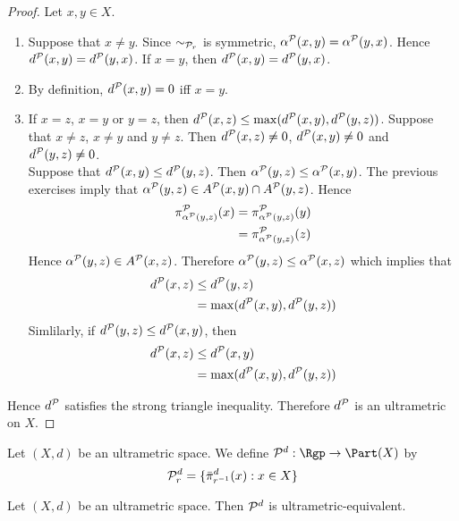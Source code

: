 \documentclass{book}
\begin{document}
\begin{proof}
	Let $x, y \in X$. 
	\begin{enumerate}
		\item Suppose that $x \neq y$. Since ${\sim_{\mathcal{P}_r}}$ is symmetric, $\alpha^{\mathcal{P}}(x,y) = \alpha^{\mathcal{P}}(y,x)$. Hence $d^{\mathcal{P}}(x,y) = d^{\mathcal{P}}(y,x)$. If $x = y$, then $d^{\mathcal{P}}(x,y) = d^{\mathcal{P}}(y,x)$. 
		\item By definition, $d^{\mathcal{P}}(x,y) = 0$ iff $x = y$.  
		\item If $x = z$, $x = y$ or $y=z$, then $d^{\mathcal{P}}(x,z) \leq \max(d^{\mathcal{P}}(x,y), d^{\mathcal{P}}(y,z))$. Suppose that $x \neq z$, $x \neq y$ and $y \neq z$. Then $d^{\mathcal{P}}(x,z) \neq 0$, $d^{\mathcal{P}}(x,y) \neq 0$ and $d^{\mathcal{P}}(y,z) \neq 0$. \\
		Suppose that $d^{\mathcal{P}}(x,y) \leq d^{\mathcal{P}}(y,z)$. Then $\alpha^{\mathcal{P}}(y,z) \leq \alpha^{\mathcal{P}}(x,y)$. The previous exercises imply that $\alpha^{\mathcal{P}}(y,z) \in A^{\mathcal{P}}(x,y) \cap A^{\mathcal{P}}(y,z)$. Hence
		\begin{align*}
			\pi^{\mathcal{P}}_{\alpha^{\mathcal{P}}(y,z)}(x) 
			& = \pi^{\mathcal{P}}_{\alpha^{\mathcal{P}}(y,z)}(y) \\
			& = \pi^{\mathcal{P}}_{\alpha^{\mathcal{P}}(y,z)}(z)
		\end{align*}
		Hence $\alpha^{\mathcal{P}}(y,z) \in A^{\mathcal{P}}(x, z)$. Therefore $\alpha^{\mathcal{P}}(y,z) \leq \alpha^{\mathcal{P}}(x,z)$ which implies that 
		\begin{align*}
			d^{\mathcal{P}}(x,z) 
			& \leq d^{\mathcal{P}}(y,z) \\
			& = \max(d^{\mathcal{P}}(x,y), d^{\mathcal{P}}(y,z))
		\end{align*}
		Simlilarly, if $d^{\mathcal{P}}(y,z) \leq d^{\mathcal{P}}(x,y)$, then 
		\begin{align*}
			d^{\mathcal{P}}(x,z) 
			& \leq d^{\mathcal{P}}(x,y) \\
			& = \max(d^{\mathcal{P}}(x,y), d^{\mathcal{P}}(y,z))
		\end{align*}
	\end{enumerate}
	Hence $d^{\mathcal{P}}$ satisfies the strong triangle inequality. Therefore $d^{\mathcal{P}}$ is an ultrametric on $X$.  
\end{proof}

\begin{defn}
	Let $(X, d)$ be an ultrametric space. We define $\MP^d: \Rgp \rightarrow \Part(X)$ by $$\mathcal{P}^d_r = \{\bar{\pi}^d_{r^{-1}}(x): x \in X\}$$
\end{defn}

\begin{ex}
	Let $(X, d)$ be an ultrametric space. Then $\mathcal{P}^d$ is ultrametric-equivalent.
\end{ex}
\end{document}
